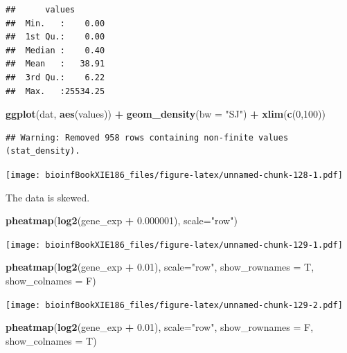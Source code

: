 \documentclass[]{book}
\makeatletter
\newenvironment{Shaded}{\begin{snugshade}}{\end{snugshade}}
\newcommand{\DataTypeTok}[1]{\textcolor[rgb]{0.13,0.29,0.53}{#1}}
\newcommand{\DecValTok}[1]{\textcolor[rgb]{0.00,0.00,0.81}{#1}}
\newcommand{\FloatTok}[1]{\textcolor[rgb]{0.00,0.00,0.81}{#1}}
\newcommand{\KeywordTok}[1]{\textcolor[rgb]{0.13,0.29,0.53}{\textbf{#1}}}
\newcommand{\NormalTok}[1]{#1}
\newcommand{\OperatorTok}[1]{\textcolor[rgb]{0.81,0.36,0.00}{\textbf{#1}}}
\newcommand{\StringTok}[1]{\textcolor[rgb]{0.31,0.60,0.02}{#1}}
\newenvironment{kframe}{%
\medskip{}
\setlength{\fboxsep}{.8em}
 \def\at@end@of@kframe{}%
 \ifinner\ifhmode%
  \def\at@end@of@kframe{\end{minipage}}%
  \begin{minipage}{\columnwidth}%
 \fi\fi%
 \def\FrameCommand##1{\hskip\@totalleftmargin \hskip-\fboxsep
 \colorbox{shadecolor}{##1}\hskip-\fboxsep
     \hskip-\linewidth \hskip-\@totalleftmargin \hskip\columnwidth}%
 \MakeFramed {\advance\hsize-\width
   \@totalleftmargin\z@ \linewidth\hsize
   \@setminipage}}%
 {\par\unskip\endMakeFramed%
 \at@end@of@kframe}
\renewenvironment{Shaded}{\begin{kframe}}{\end{kframe}}
\makeatother
\begin{document}
\begin{verbatim}
##      values        
##  Min.   :    0.00  
##  1st Qu.:    0.00  
##  Median :    0.40  
##  Mean   :   38.91  
##  3rd Qu.:    6.22  
##  Max.   :25534.25
\end{verbatim}

\begin{Shaded}
\begin{Highlighting}[]
\KeywordTok{ggplot}\NormalTok{(dat, }\KeywordTok{aes}\NormalTok{(values)) }\OperatorTok{+}\StringTok{ }\KeywordTok{geom_density}\NormalTok{(}\DataTypeTok{bw =} \StringTok{"SJ"}\NormalTok{) }\OperatorTok{+}\StringTok{ }\KeywordTok{xlim}\NormalTok{(}\KeywordTok{c}\NormalTok{(}\DecValTok{0}\NormalTok{,}\DecValTok{100}\NormalTok{))}
\end{Highlighting}
\end{Shaded}

\begin{verbatim}
## Warning: Removed 958 rows containing non-finite values (stat_density).
\end{verbatim}

\texttt{[image: bioinfBookXIE186\_files/figure-latex/unnamed-chunk-128-1.pdf]}

The data is skewed.

\begin{Shaded}
\begin{Highlighting}[]
\KeywordTok{pheatmap}\NormalTok{(}\KeywordTok{log2}\NormalTok{(gene_exp }\OperatorTok{+}\StringTok{ }\FloatTok{0.000001}\NormalTok{), }\DataTypeTok{scale=}\StringTok{"row"}\NormalTok{)}
\end{Highlighting}
\end{Shaded}

\texttt{[image: bioinfBookXIE186\_files/figure-latex/unnamed-chunk-129-1.pdf]}

\begin{Shaded}
\begin{Highlighting}[]
\KeywordTok{pheatmap}\NormalTok{(}\KeywordTok{log2}\NormalTok{(gene_exp }\OperatorTok{+}\StringTok{ }\FloatTok{0.01}\NormalTok{), }\DataTypeTok{scale=}\StringTok{"row"}\NormalTok{, }\DataTypeTok{show_rownames =}\NormalTok{ T, }\DataTypeTok{show_colnames =}\NormalTok{ F)}
\end{Highlighting}
\end{Shaded}

\texttt{[image: bioinfBookXIE186\_files/figure-latex/unnamed-chunk-129-2.pdf]}

\begin{Shaded}
\begin{Highlighting}[]
\KeywordTok{pheatmap}\NormalTok{(}\KeywordTok{log2}\NormalTok{(gene_exp }\OperatorTok{+}\StringTok{ }\FloatTok{0.01}\NormalTok{), }\DataTypeTok{scale=}\StringTok{"row"}\NormalTok{, }\DataTypeTok{show_rownames =}\NormalTok{ F, }\DataTypeTok{show_colnames =}\NormalTok{ T)}
\end{Highlighting}
\end{Shaded}
\end{document}
